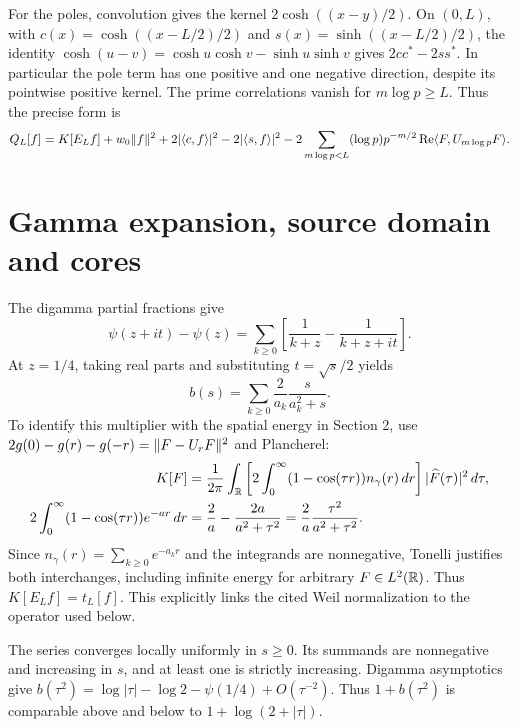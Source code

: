 For the poles, convolution gives the kernel $2\cosh((x-y)/2)$.
On $(0,L)$, with $c(x)=\cosh((x-L/2)/2)$ and
$s(x)=\sinh((x-L/2)/2)$, the identity
$\cosh(u-v)=\cosh u\cosh v-\sinh u\sinh v$ gives
$2cc^*-2ss^*$. In particular the pole term has one positive and one
negative direction, despite its pointwise positive kernel.
The prime correlations vanish for $m\log p\ge L$. Thus the precise
form is
\begin{equation}\label{d:full-form}
Q_L[f]=K[E_Lf]+w_0\lVert f\rVert^2+2|\langle c,f\rangle|^2-2|\langle s,f\rangle|^2
-2\sum_{m\log p<L}(\log p)p^{-m/2}\operatorname{Re}\langle F,U_{m\log p}F\rangle.
\end{equation}

\section{Gamma expansion, source domain and cores}
The digamma partial fractions \cite{DLMF} give
\[
\psi(z+it)-\psi(z)=\sum_{k\ge0}
\left[\frac1{k+z}-\frac1{k+z+it}\right].
\]
At $z=1/4$, taking real parts and substituting $t=\sqrt{s}/2$ yields
\begin{equation}\label{d:gamma-series}
b(s)=\sum_{k\ge0}\frac2{a_k}\frac{s}{a_k^2+s}.
\end{equation}
To identify this multiplier with the spatial energy in Section 2, use
$2g(0)-g(r)-g(-r)=\lVert F-U_rF\rVert^2$ and Plancherel:
\begin{align}
K[F]&=\frac1{2\pi}\int_\mathbb R
\left[2\int_0^\infty(1-\cos(\tau r))n_\gamma(r)\,dr\right]
|\widehat F(\tau)|^2\,d\tau,\label{d:gamma-fourier}\\
2\int_0^\infty(1-\cos(\tau r))e^{-ar}\,dr
&=\frac2a-\frac{2a}{a^2+\tau^2}
=\frac2a\frac{\tau^2}{a^2+\tau^2}.\notag
\end{align}
Since $n_\gamma(r)=\sum_{k\ge0}e^{-a_kr}$ and the integrands are
nonnegative, Tonelli justifies both interchanges, including infinite
energy for arbitrary $F\in L^2(\mathbb R)$. Thus
$K[E_Lf]=t_L[f]$. This explicitly links the cited Weil normalization
to the operator used below.

The series converges locally uniformly in $s\ge0$. Its summands are
nonnegative and increasing in $s$, and at least one is strictly increasing.
Digamma asymptotics give
$b(\tau^2)=\log|\tau|-\log2-\psi(1/4)+O(\tau^{-2})$.
Thus $1+b(\tau^2)$ is comparable above and below to
$1+\log(2+|\tau|)$.

